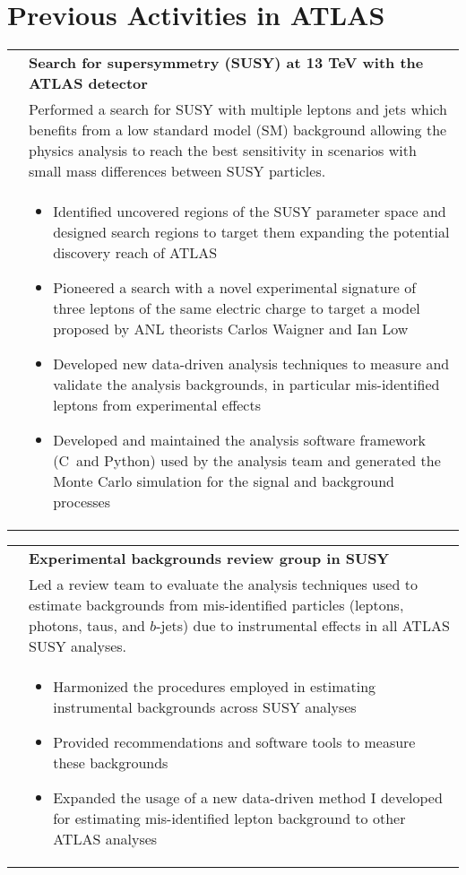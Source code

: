 \documentclass[a4paper,10pt]{article}
\newcommand{\CC}{C\nolinebreak\hspace{-.05em}\raisebox{.4ex}{\tiny\bf +}\nolinebreak\hspace{-.10em}\raisebox{.4ex}{\tiny\bf +}}
\begin{document}
\section{Previous Activities in ATLAS}
\begin{tabularx}{\textwidth}{>{\centering\arraybackslash}X p{} }
  {\sl 2015--2017} & {\bf Search for supersymmetry (SUSY) at 13 TeV with the ATLAS detector} \\
  & Performed a search for SUSY with multiple leptons and jets which benefits from a low
  standard model (SM) background allowing the physics analysis to reach the best sensitivity in scenarios with small
  mass differences between SUSY particles.\\[-1.5ex]
  & \begin{itemize}
  \item Identified uncovered regions of the SUSY parameter space and designed search regions to target them expanding the
    potential discovery reach of ATLAS
  \item Pioneered a search with a novel experimental signature of three leptons of the same electric charge to target a model
    proposed by ANL theorists Carlos Waigner and Ian Low
  \item Developed new data-driven analysis techniques to measure and validate the analysis backgrounds, in particular mis-identified
    leptons from experimental effects
  \item Developed and maintained the analysis software framework (\CC~and Python) used by the analysis team and generated the Monte Carlo
    simulation for the signal and background processes
  \end{itemize}\\[-1.5ex]
\end{tabularx}
\begin{tabularx}{\textwidth}{>{\centering\arraybackslash}X p{} }
 {\sl 2016--2017} & {\bf Experimental backgrounds review group in SUSY} \\
  & Led a review team to evaluate the analysis techniques used to estimate backgrounds from mis-identified particles
  (leptons, photons, taus, and $b$-jets) due to instrumental effects in all ATLAS SUSY analyses.\\
  & \begin{itemize}
  \item Harmonized the procedures employed in estimating instrumental backgrounds across SUSY analyses
  \item Provided recommendations and software tools to measure these backgrounds
  \item Expanded the usage of a new data-driven method I developed for estimating mis-identified lepton background to other ATLAS analyses
  \end{itemize}\\
\end{tabularx}
\end{document}
